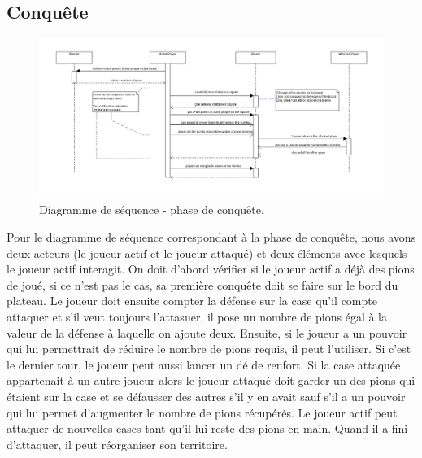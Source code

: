 \documentclass[11pt]{report}
\begin{document}
		\subsection{Conquête}
		\begin{figure}[!h]
\centering
\includegraphics[width=13cm]{Conquetesequence.png}
\caption{Diagramme de séquence - phase de conquête.}
\end{figure}
		Pour le diagramme de séquence correspondant à la phase de conquête, nous avons deux acteurs (le joueur actif et le joueur attaqué) et deux éléments avec lesquels le joueur actif interagit. On doit d'abord vérifier si le joueur actif a déjà des pions de joué, si ce n'est pas le cas, sa première conquête doit se faire sur le bord du plateau. Le joueur doit ensuite compter la défense sur la case qu'il compte attaquer et s'il veut toujours l'attasuer, il pose un nombre de pions égal à la valeur de la défense à laquelle on ajoute deux. Ensuite, si le joueur a un pouvoir qui lui permettrait  de réduire le nombre de pions requis, il peut l'utiliser. Si c'est le dernier tour, le joueur peut aussi lancer un dé de renfort. Si la case attaquée appartenait à un autre joueur alors le joueur attaqué doit garder un des pions qui étaient sur la case et se défausser des autres s'il y en avait sauf s'il a un pouvoir qui lui permet d'augmenter le nombre de pions récupérés. Le joueur actif peut attaquer de nouvelles cases tant qu'il lui reste des pions en main. Quand il a fini d'attaquer, il peut réorganiser son territoire.
\end{document}
